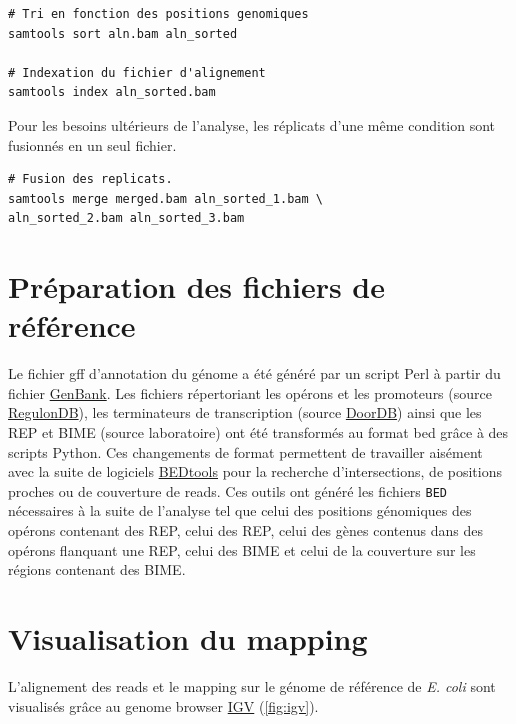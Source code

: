 \documentclass[12pt,a4paper]{report}
\begin{document}
\begin{onehalfspace}
\begin{lstlisting}[frame=single]
# Tri en fonction des positions genomiques
samtools sort aln.bam aln_sorted

# Indexation du fichier d'alignement
samtools index aln_sorted.bam
\end{lstlisting}

Pour les besoins ultérieurs de l'analyse, les réplicats d'une même condition sont fusionnés en un seul fichier.
\begin{lstlisting}[frame=single]
# Fusion des replicats.
samtools merge merged.bam aln_sorted_1.bam \
aln_sorted_2.bam aln_sorted_3.bam
\end{lstlisting}

\section*{Préparation des fichiers de référence}
Le fichier \gls{gff} d'annotation du génome a été généré par un script Perl à partir du fichier \href{http://www.ncbi.nlm.nih.gov/nuccore/NC_000913.2}{GenBank}. Les fichiers répertoriant les opérons et les promoteurs (source \href{http://regulondb.ccg.unam.mx/}{RegulonDB}), les terminateurs de transcription (source \href{http://csbl.bmb.uga.edu/DOOR/}{DoorDB}) ainsi que les REP et BIME (source laboratoire) ont été transformés au format \gls{bed} grâce à des scripts Python.
Ces changements de format permettent de travailler aisément avec la suite de logiciels \href{http://bedtools.readthedocs.org/en/latest/}{BEDtools} pour la recherche d'intersections, de positions proches ou de \gls{couverture} de reads. Ces outils ont généré les fichiers \texttt{BED} nécessaires à la suite de l'analyse tel que celui des positions génomiques des opérons contenant des REP, celui des REP, celui des gènes contenus dans des opérons flanquant une REP, celui des BIME et celui de la couverture sur les régions contenant des BIME.

\section*{Visualisation du mapping}
L'alignement des reads et le mapping sur le génome de référence de \textit{E. coli} sont visualisés grâce au genome browser \href{https://www.broadinstitute.org/igv/}{IGV} \citep{Robinson2011,Thorvaldsdottir2013} (\autoref{fig:igv}).


\end{onehalfspace}
\end{document}
